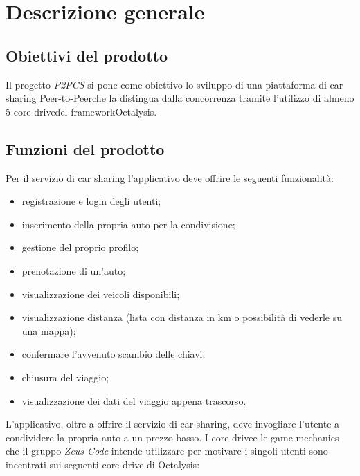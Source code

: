 \section{Descrizione generale} 
\subsection{Obiettivi del prodotto}
Il progetto \textit{P2PCS} si pone come obiettivo lo sviluppo di una piattaforma di car sharing Peer-to-Peer\glosp che la distingua dalla concorrenza tramite l'utilizzo di almeno 5 core-drive\glosp del framework\glosp Octalysis\glo.

\subsection{Funzioni del prodotto}
Per il servizio di car sharing l'applicativo deve offrire le seguenti funzionalità:
\begin{itemize}
	\item registrazione e login degli utenti;
	\item inserimento della propria auto per la condivisione;
	\item gestione del proprio profilo;
	\item prenotazione di un'auto;
	\item visualizzazione dei veicoli disponibili;
	\item visualizzazione distanza (lista con distanza in km o possibilità di vederle su una mappa);
	\item confermare l’avvenuto scambio delle chiavi;
	\item chiusura del viaggio;
	\item visualizzazione dei dati del viaggio appena trascorso.
	\newline
\end{itemize}
L'applicativo, oltre a offrire il servizio di car sharing, deve invogliare l'utente a condividere la propria auto a un prezzo basso. 
I core-drive\glosp e le game mechanics che il gruppo \textit{Zeus Code} intende utilizzare per motivare i singoli utenti sono incentrati sui seguenti core-drive di Octalysis\glo: 
